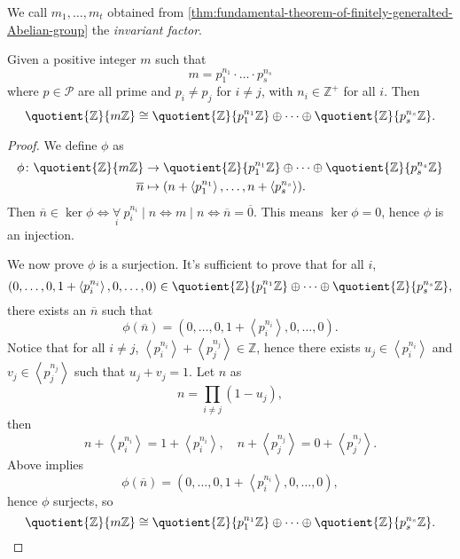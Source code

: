 \begin{definition}\label{def:invariant-factor}
	We call \(m_1, \dots , m_t \) obtained from \autoref{thm:fundamental-theorem-of-finitely-generalted-Abelian-group} the \emph{invariant factor}.
\end{definition}

\begin{lemma}\label{lma:Chinese-remainder-theorem}
	Given a positive integer \(m\) such that
	\[
		m = p_1^{n_1}\cdot \dots \cdot p_s^{n_s}
	\]
	where \(p\in \mathcal{P} \) are all prime and \(p_{i} \neq p_{j} \) for \(i\neq j\), with \(n_{i} \in \mathbb{Z} ^+\) for all \(i\).
	Then
	\[
		\quotient{\mathbb{Z}}{m\mathbb{Z} } \cong \quotient{\mathbb{Z} }{p_1^{n_1}\mathbb{Z} } \oplus \dots \oplus \quotient{\mathbb{Z} }{p_s^{n_s}\mathbb{Z} }.
	\]
\end{lemma}
\begin{proof}
	We define \(\phi\) as
	\[
		\begin{split}
			\phi \colon \quotient{\mathbb{Z} }{m\mathbb{Z} } & \to \quotient{\mathbb{Z} }{p_1^{n_1}\mathbb{Z} } \oplus \dots \oplus \quotient{\mathbb{Z} }{p_s^{n_s}\mathbb{Z} } \\
			\overline{n}                                     & \mapsto (n + \left< p_1^{n_1} \right>, \dots , n + \left< p_s^{n_s} \right>  ).
		\end{split}
	\]
	Then \(\overline{n} \in \ker  \phi \iff \underset{i}{\forall }\ p_i^{n_{i} }\mid n \iff m\mid n \iff \overline{n} = \overline{0}\). This means \(\ker  \phi = 0\), hence \(\phi \) is an injection.

	We now prove \(\phi \) is a surjection. It's sufficient to prove that for all \(i\),
	\[
		(0, \dots , 0, 1+ \left< p_i ^{n_{i} } \right>, 0, \dots , 0)\in \quotient{\mathbb{Z} }{p_1^{n_1}\mathbb{Z} } \oplus \dots \oplus \quotient{\mathbb{Z} }{p_{s} ^{n_{s} }\mathbb{Z} },
	\]
	there exists an \(\overline{n} \) such that
	\[
		\phi (\overline{n} ) = (0, \dots , 0, 1+\left< p_{i} ^{n_{i}}\right>, 0, \dots , 0).
	\]
	Notice that for all \(i\neq j\), \(\left< p_{i} ^{n_{i} } \right> + \left< p_{j} ^{n_{j} } \right> \in \mathbb{Z}  \), hence there exists \(u_{j} \in \left< p_{i} ^{n_{i} } \right> \) and
	\(v_{j} \in \left< p_{j} ^{n_{j} } \right> \) such that \(u_{j} + v_{j} = 1\). Let \(n\) as
	\[
		n = \prod\limits_{i\neq j}(1 - u_{j} ),
	\]
	then
	\[
		n + \left< p_{i} ^{n_{i} } \right> = 1 + \left<  p_{i} ^{n_{i} }\right>,\quad n + \left< p_{j} ^{n_{j} } \right> = 0 + \left< p_{j} ^{n_{j} } \right>.
	\]
	Above implies
	\[
		\phi (\overline{n} ) = (0, \dots , 0, 1 + \left< p_{i} ^{n_{i} } \right> , 0, \dots , 0),
	\]
	hence \(\phi \) surjects, so
	\[
		\quotient{\mathbb{Z}}{m\mathbb{Z} } \cong \quotient{\mathbb{Z} }{p_1^{n_1}\mathbb{Z} } \oplus \dots \oplus \quotient{\mathbb{Z} }{p_s^{n_s}\mathbb{Z} }.
	\]
\end{proof}

